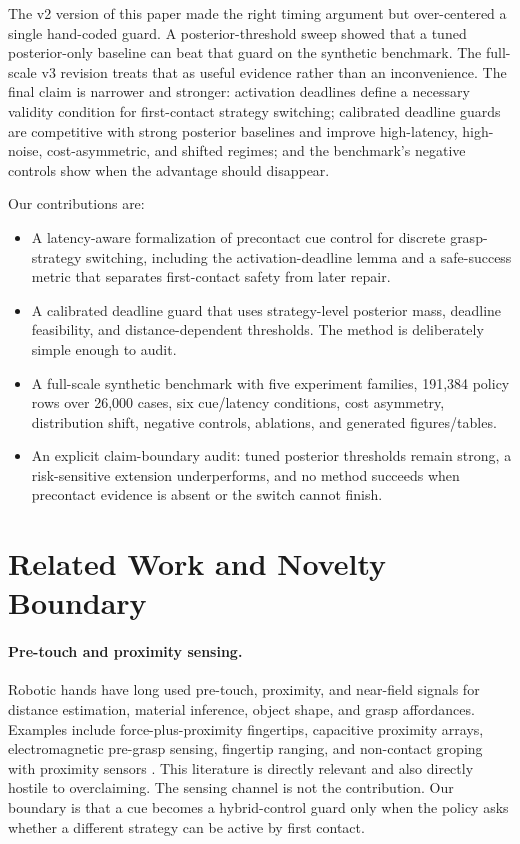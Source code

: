 \documentclass{article}
\begin{document}
The v2 version of this paper made the right timing argument but over-centered a single hand-coded guard. A posterior-threshold sweep showed that a tuned posterior-only baseline can beat that guard on the synthetic benchmark. The full-scale v3 revision treats that as useful evidence rather than an inconvenience. The final claim is narrower and stronger: activation deadlines define a necessary validity condition for first-contact strategy switching; calibrated deadline guards are competitive with strong posterior baselines and improve high-latency, high-noise, cost-asymmetric, and shifted regimes; and the benchmark's negative controls show when the advantage should disappear.

Our contributions are:
\begin{itemize}
\item A latency-aware formalization of precontact cue control for discrete grasp-strategy switching, including the activation-deadline lemma and a safe-success metric that separates first-contact safety from later repair.
\item A calibrated deadline guard that uses strategy-level posterior mass, deadline feasibility, and distance-dependent thresholds. The method is deliberately simple enough to audit.
\item A full-scale synthetic benchmark with five experiment families, 191,384 policy rows over 26,000 cases, six cue/latency conditions, cost asymmetry, distribution shift, negative controls, ablations, and generated figures/tables.
\item An explicit claim-boundary audit: tuned posterior thresholds remain strong, a risk-sensitive extension underperforms, and no method succeeds when precontact evidence is absent or the switch cannot finish.
\end{itemize}

\section{Related Work and Novelty Boundary}

\paragraph{Pre-touch and proximity sensing.}
Robotic hands have long used pre-touch, proximity, and near-field signals for distance estimation, material inference, object shape, and grasp affordances. Examples include force-plus-proximity fingertips, capacitive proximity arrays, electromagnetic pre-grasp sensing, fingertip ranging, and non-contact groping with proximity sensors \citep{rw007,rw011,rw015,rw021,rw024,rw026,rw031,rw040}. This literature is directly relevant and also directly hostile to overclaiming. The sensing channel is not the contribution. Our boundary is that a cue becomes a hybrid-control guard only when the policy asks whether a different strategy can be active by first contact.
\end{document}
